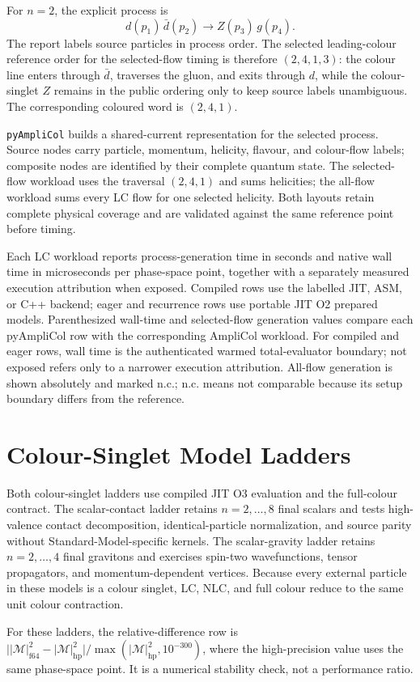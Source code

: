 \documentclass[10pt,letterpaper]{article}
\newif\ifReportLandscapePage
\newcommand{\PAC}{\texttt{pyAmpliCol}}
\newcommand{\ReportTableNote}[1]{\par\smallskip\noindent\footnotesize\textcolor{ReportMuted}{#1}\par}
\newcommand{\ReportLadderLegend}{\ReportTableNote{Each LC workload reports process-generation time in seconds and native wall time in microseconds per phase-space point, together with a separately measured execution attribution when exposed. Compiled rows use the labelled JIT, ASM, or C++ backend; eager and recurrence rows use portable JIT O2 prepared models. Parenthesized wall-time and selected-flow generation values compare each pyAmpliCol row with the corresponding AmpliCol workload. For compiled and eager rows, wall time is the authenticated warmed total-evaluator boundary; not exposed refers only to a narrower execution attribution. All-flow generation is shown absolutely and marked n.c.; n.c. means not comparable because its setup boundary differs from the reference.}}
\newcommand{\ReportLandscapeFooter}{}
\begin{document}
\begin{landscape}
For \(n=2\), the explicit process is
\[
  d(p_1)\,\bar d(p_2)\to Z(p_3)\,g(p_4).
\]
The report labels source particles in process order. The selected leading-colour
reference order for the selected-flow timing is therefore \((2,4,1,3)\): the
colour line enters through \(\bar d\), traverses the gluon, and exits through
\(d\), while the colour-singlet \(Z\) remains in the public ordering only to
keep source labels unambiguous. The corresponding coloured word is
\((2,4,1)\).

\PAC{} builds a shared-current representation for the selected process. Source
nodes carry particle, momentum, helicity, flavour, and colour-flow labels;
composite nodes are identified by their complete quantum state. The
selected-flow workload uses the traversal \((2,4,1)\) and sums helicities; the
all-flow workload sums every LC flow for one selected helicity. Both layouts
retain complete physical coverage and are validated against the same reference
point before timing.

\clearpage

\clearpage

\ReportLadderLegend
\ReportLandscapeFooter
\end{landscape}
\ReportLandscapePagefalse
\clearpage
\pagestyle{fancy}

\section{Colour-Singlet Model Ladders}

Both colour-singlet ladders use compiled JIT O3 evaluation and the full-colour
contract. The scalar-contact ladder retains $n=2,\ldots,8$ final scalars and
tests high-valence contact decomposition, identical-particle normalization,
and source parity without Standard-Model-specific kernels. The scalar-gravity
ladder retains $n=2,\ldots,4$ final gravitons and exercises spin-two
wavefunctions, tensor propagators, and momentum-dependent vertices. Because
every external particle in these models is a colour singlet, LC, NLC, and full
colour reduce to the same unit colour contraction.

For these ladders, the relative-difference row is
\(\bigl||\mathcal M|^2_{\mathrm{f64}}-|\mathcal M|^2_{\mathrm{hp}}\bigr|
/\max(|\mathcal M|^2_{\mathrm{hp}},10^{-300})\), where the high-precision value
uses the same phase-space point. It is a numerical stability check, not a
performance ratio.



\end{document}
